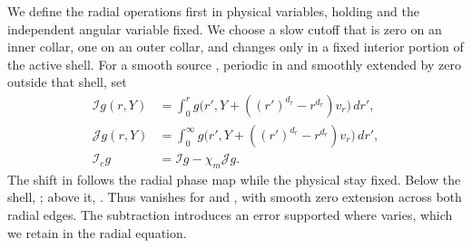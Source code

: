 We define the radial operations first in physical variables, holding
 and the independent angular variable fixed. We choose a slow cutoff
 that is zero on an inner collar,
one on an outer collar, and changes only in a fixed interior portion of the active shell. For a
smooth source , periodic in
 and smoothly extended by zero outside that shell,
%
set
\begin{equation}
\begin{aligned}
  \mathcal I g(r,Y)
    &=\int_0^r g\bigl(r',Y+((r')^{d_r}-r^{d_r})v_r\bigr)\,dr',\\
  \mathcal J g(r,Y)
    &=\int_0^\infty g\bigl(r',Y+((r')^{d_r}-r^{d_r})v_r\bigr)\,dr',\\
  \mathcal I_c g&=\mathcal I g-\chi_m\mathcal J g.
\end{aligned}
\tag{8.4}\label{eq:8.4}
\end{equation}
The shift in  follows the radial phase map while the physical
 stay fixed. Below the
shell, ; above it,
. Thus
 vanishes for
 and , with smooth
zero extension across both radial edges. The subtraction introduces an error supported
where  varies, which we retain in the radial equation.

